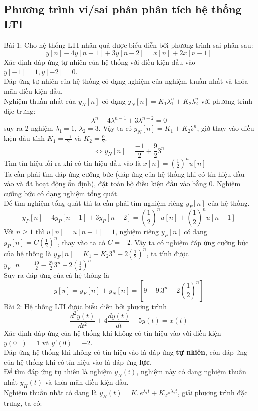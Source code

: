 \documentclass{article}
\begin{document}
\subsection{Phương trình vi/sai phân phân tích hệ thống LTI}
Bài 1: Cho hệ thống LTI nhân quả được biểu diễn bởi phương trình sai phân sau:
$$y[n]-4y[n-1]+3y[n-2]=x[n]+2x[n-1]$$
Xác định đáp ứng tự nhiên của hệ thống với điều kiện đầu vào $y[-1]=1, y[-2]=0$.
\\Đáp ứng tự nhiên của hệ thống có dạng nghiệm của nghiệm thuần nhất và thỏa mãn điều kiện đầu.
\\Nghiệm thuần nhất của $y_{N}[n]$ có dạng $y_{N}[n]=K_{1}\lambda_{1}^{n}+K_{2}\lambda_{2}^{n}$ với phương trình đặc trưng:
$$\lambda^{n}-4\lambda^{n-1}+3\lambda^{n-2}=0$$ suy ra 2 nghiệm $\lambda_{1}=1$, $\lambda_{2}=3$. Vậy ta có
$y_{N}[n]=K_{1}+K_{2}3^{n}$, giờ thay vào điều kiện đầu tính $K_{1}=\frac{-1}{2}$ và $K_{2}=\frac{9}{2}$.
$$\Leftrightarrow y_{N}[n]=\frac{-1}{2}+\frac{9}{2}3^{n}$$
Tìm tín hiệu lối ra khi có tín hiệu đầu vào là $x[n]=\left(\frac{1}{2}\right)^{n}u[n]$
\\Ta cần phải tìm đáp ứng cưỡng bức (đáp ứng của hệ thống khi có tín hiệu đầu vào và đã hoạt động ổn định), đặt toàn bộ điều kiện đầu vào bằng $0$. Nghiệm cưỡng bức
có dạng nghiệm tổng quát.
\\Để tìm nghiệm tổng quát thì ta cần phải tìm nghiệm riêng $y_{P}[n]$ của hệ thống.
$$y_{P}[n]-4y_{P}[n-1]+3y_{P}[n-2]=\left(\frac{1}{2}\right)^{n}u[n]+\left(\frac{1}{2}\right)^{n}u[n-1]$$
Với $n\geq1$ thì $u[n]=u[n-1]=1$, nghiệm riêng $y_{P}[n]$ có dạng $y_{P}[n]=C\left(\frac{1}{2}\right)^{n}$, thay vào ta có $C=-2$.
Vậy ta có nghiệm đáp ứng cưỡng bức của hệ thống là $y_{F}[n]=K_{1}+K_{2}3^{n}-2\left(\frac{1}{2}\right)^{n}$, ta tính được $y_{F}[n]=\frac{19}{2}-\frac{27}{2}3^{n}-2\left(\frac{1}{2}\right)^{n}$
\\Suy ra đáp ứng của cả hệ thống là 
$$y[n]=y_{F}[n]+y_{N}[n]=\left[9-9.3^{n}-2\left(\frac{1}{2}\right)^{n}\right]$$
Bài 2:
Hệ thống LTI được biểu diễn bởi phương trình
$$\frac{d^{2}y(t)}{dt^2}+4\frac{dy(t)}{dt}+5y(t)=x(t)$$
Xác định đáp ứng của hệ thống khi không có tín hiệu vào với điều kiện $y(0^{-})=1$ và $y'(0)=-2$.
\\Đáp ứng hệ thống khi không có tín hiệu vào là đáp ứng \textbf{tự nhiên}, còn đáp ứng của hệ thống khi có tín hiệu vào là đáp ứng \textbf{lực}.
\\Để tìm đáp ứng tự nhiên là nghiệm $y_{N}(t)$, nghiệm này có dạng nghiệm thuần nhất $y_{H}(t)$ và thỏa mãn điều kiện đầu.
\\Nghiệm thuần nhất có dạng là $y_{H}(t)=K_{1}e^{\lambda_{1}t}+K_{2}e^{\lambda_{2}t}$, giải phương trình đặc trưng, ta có:
\end{document}
